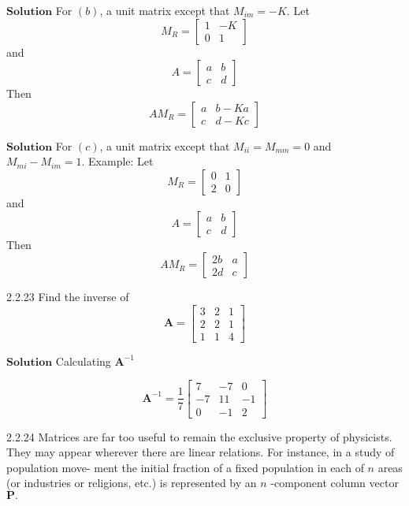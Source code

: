 \documentclass{article}
\begin{document}
\begin{flushleft}
$\boxed{\textbf{Solution}}$  For $(b)$, a unit matrix except that $M_{i m}=-K$.
Let 
$$M_{R}=\left[\begin{array}{cc}1 & -K \\ 0 & 1\end{array}\right]$$ 
and 
$$A=\left[\begin{array}{ll}a & b \\ c & d\end{array}\right]$$
Then 
$$A M_{R}=\left[\begin{array}{ll}a & b-K a \\ c & d-K c\end{array}\right]$$


$\boxed{\textbf{Solution}}$  For $(c)$, a unit matrix except that $M_{i i}=M_{m m}=0$ and $M_{m i}-M_{i m}=1$.
Example: Let 
$$M_{R}=\left[\begin{array}{ll}0 & 1 \\ 2 & 0\end{array}\right]$$ 
and 
$$A=\left[\begin{array}{ll}a & b \\ c & d\end{array}\right]$$
Then 
$$A M_{R}=\left[\begin{array}{ll}2 b & a \\ 2 d & c\end{array}\right]$$


\newpage



\begin{mybox}{2.2.23}
Find the inverse of
$$
\mathbf{A}=\begin{bmatrix}{3} & {2} & {1} \\ {2} & {2} & {1} \\ {1} & {1} & {4}\end{bmatrix}
$$
\end{mybox}


$\boxed{\textbf{Solution}}$ Calculating $\mathbf{A}^{-1}$


$$\mathbf{A}^{-1}=\frac{1}{7}\begin{bmatrix}{7} & {-7} & {0} \\ {-7} & {11} & {-1} \\ {0} & {-1} & {2}\end{bmatrix}$$



\newpage

\begin{mybox}{2.2.24}
Matrices are far too useful to remain the exclusive property of physicists. They may
appear wherever there are linear relations. For instance, in a study of population move-
ment the initial fraction of a fixed population in each of $n$ areas (or industries or
religions, etc.) is represented by an $n$ -component column vector $\mathbf{P} .$ 


\end{mybox}
\end{flushleft}
\end{document}
